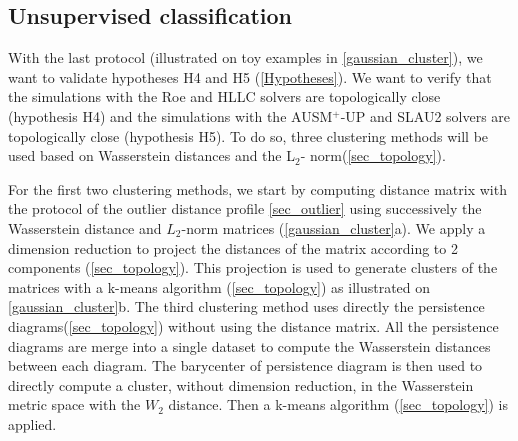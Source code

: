 


\subsection{Unsupervised classification}
\label{sec_unsupervised}


With the last protocol (illustrated on toy examples in \autoref{gaussian_cluster}),
we want to validate hypotheses H4 and H5 (\autoref{Hypotheses}). We want to verify that the
simulations with the Roe and HLLC solvers are topologically close (hypothesis H4) and the
simulations with the AUSM$^+$-UP and SLAU2 solvers are topologically close (hypothesis H5). To do so, three clustering methods will be used based on Wasserstein distances and the L$_2$- norm(\autoref{sec_topology}).

For the first two clustering methods, we start by computing distance matrix with the protocol of the outlier distance profile \autoref{sec_outlier} using successively the Wasserstein distance and $L_2$-norm matrices (\autoref{gaussian_cluster}a). We apply a dimension reduction to project the distances of the matrix according to 2 components (\autoref{sec_topology}). This projection is used to generate clusters of the matrices with a k-means algorithm (\autoref{sec_topology}) as illustrated on \autoref{gaussian_cluster}b. The third clustering method uses directly the persistence diagrams(\autoref{sec_topology}) without using the distance matrix. All the persistence diagrams are merge into a single dataset to compute the Wasserstein distances between each diagram. The barycenter of persistence diagram is then used to directly compute a cluster, without dimension reduction, in the Wasserstein metric space \cite{vidal_vis19} with the ${W_2}$ distance. Then a k-means algorithm (\autoref{sec_topology}) is applied. 

